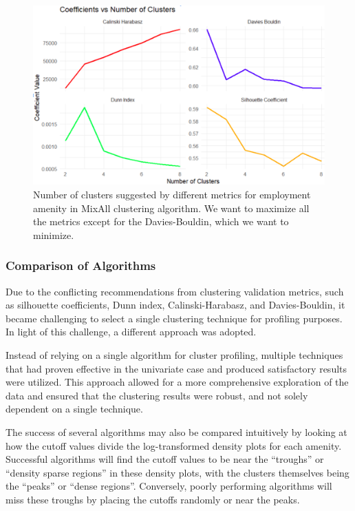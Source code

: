 \documentclass[11pt, a4paper]{article}
\begin{document}
\begin{figure}[H]
\centering
\includegraphics[width=\textwidth]{./coefs_demo/coefs_demo.png}
\caption[Number of cluster selection]{Number of clusters suggested by different metrics for employment amenity in MixAll clustering algorithm. We want to maximize all the metrics except for the Davies-Bouldin, which we want to minimize.}\label{numselect}
\end{figure}






\subsubsection{Comparison of Algorithms}


Due to the conflicting recommendations from clustering validation metrics, such as silhouette coefficients, Dunn index, Calinski-Harabasz, and Davies-Bouldin, it became challenging to select a single clustering technique for profiling purposes. In light of this challenge, a different approach was adopted.
\par
Instead of relying on a single algorithm for cluster profiling, multiple techniques that had proven effective in the univariate case and produced satisfactory results were utilized. This approach allowed for a more comprehensive exploration of the data and ensured that the clustering results were robust, and not solely dependent on a single technique.
\par
The success of several algorithms may also be compared intuitively by looking at how the cutoff values divide the log-transformed density plots for each amenity. Successful algorithms will find the cutoff values to be near the “troughs” or ``density sparse regions'' in these density plots, with the clusters themselves being the ``peaks'' or ``dense regions''. Conversely, poorly performing algorithms will miss these troughs by placing the cutoffs randomly or near the peaks. 
\end{document}

